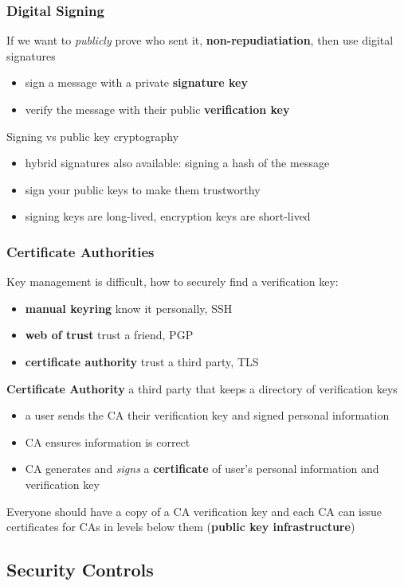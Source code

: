 \documentclass[]{article}
\theoremstyle{definition}
\begin{document}
	\subsubsection{Digital Signing}
	If we want to \textit{publicly} prove who sent it, \textbf{non-repudiatiation}, then use digital signatures
	\begin{itemize}
		\item sign a message with a private \textbf{signature key}
		\item verify the message with their public \textbf{verification key}
	\end{itemize}
	Signing vs public key cryptography
	\begin{itemize}
		\item hybrid signatures also available: signing a hash of the message
		\item sign your public keys to make them trustworthy
		\item signing keys are long-lived, encryption keys are short-lived
	\end{itemize}

	\subsubsection{Certificate Authorities}
	Key management is difficult, how to securely find a verification key:
	\begin{itemize}
		\item \textbf{manual keyring} know it personally, SSH
		\item \textbf{web of trust} trust a friend, PGP
		\item \textbf{certificate authority} trust a third party, TLS
	\end{itemize}
	\textbf{Certificate Authority} a third party that keeps a directory of verification keys
	\begin{itemize}
		\item a user sends the CA their verification key and signed personal information
		\item CA ensures information is correct
		\item CA generates and \textit{signs} a \textbf{certificate} of user's personal information and verification key
	\end{itemize}
	Everyone should have a copy of a CA verification key and each CA can issue certificates for CAs in levels below them (\textbf{public key infrastructure})
	

	\subsection{Security Controls}
\end{document}
